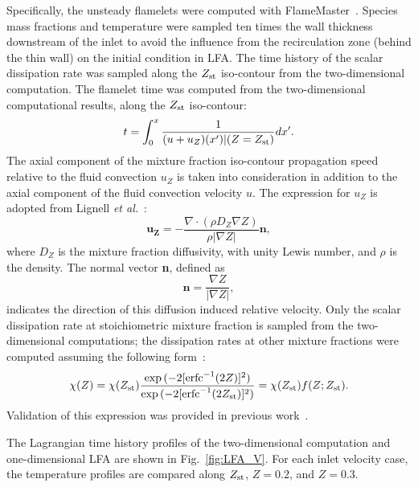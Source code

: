 \documentclass[review,3p,times]{elsarticle}
\begin{document}
Specifically, the unsteady flamelets were computed with FlameMaster~\cite{flamemaster}.  Species mass fractions and temperature were sampled ten times the wall thickness downstream of the inlet to avoid the influence from the recirculation zone (behind the thin wall) on the initial condition in LFA.  The time history of the scalar dissipation rate was sampled along the $Z_{\rm st}$ iso-contour from the two-dimensional computation.  The flamelet time was computed from the two-dimensional computational results, along the $Z_{\rm st}$ iso-contour: 
 \begin{equation} \label{eq:t}
t = \int ^{x}_{0} \frac{1}{(u + u_Z)(x')|(Z=Z_{\rm st})} dx'.
\end{equation} 
The axial component of the mixture fraction iso-contour propagation speed relative to the fluid convection $u_Z$ is taken into consideration in addition to the axial component of the fluid convection velocity $u$.  The expression for $u_Z$ is adopted from Lignell \emph {et al.}~\cite{lignell07}:
\begin{equation}
\mathbf{u_Z} = -\frac{\nabla \cdot (\rho D_Z \nabla Z) }{\rho |\nabla Z|} \mathbf{n},
\end{equation}
where $D_Z$ is the mixture fraction diffusivity, with unity Lewis number, and $\rho$ is the density.  The normal vector \textbf{n}, defined as
\begin{equation}
\mathbf{n} = \frac{\nabla Z}{|\nabla Z|},
\end{equation}
indicates the direction of this diffusion induced relative velocity.  Only the scalar dissipation rate at stoichiometric mixture fraction is sampled from the two-dimensional computations; the dissipation rates at other mixture fractions were computed assuming the following form~\cite{petersbook}:
\begin{equation} \label{eq:Zref}
\chi{(Z)} = \chi{(Z_{\rm st})} \frac{\exp{(-2[{\rm erfc}^{-1}(2Z)]^2)}}{\exp{(-2[{\rm erfc}^{-1}(2Z_{\rm st})]^2)}} = \chi{(Z_{\rm st})} f(Z;Z_{\rm st}).
\end{equation}
Validation of this expression was provided in previous work~\cite{deng15}.

The Lagrangian time history profiles of the two-dimensional computation and one-dimensional LFA are shown in Fig.~\ref{fig:LFA_V}.  For each inlet velocity case, the temperature profiles are compared along $Z_{\rm st}$, $Z = 0.2$, and $Z = 0.3$.
\end{document}
